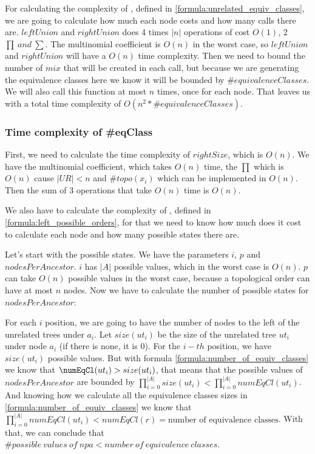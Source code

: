 For calculating the complexity of \unrEqCl, defined in \ref{formula:unrelated_equiv_classes}, we are going to calculate how much each node costs and how many calls there are. $leftUnion$ and $rightUnion$ does 4 times $|n|$ operations of cost $O(1)$, 2 $\prod \ and \ \sum$. The multinomial coefficient is $O(n)$ in the worst case, so $leftUnion$ and $rightUnion$ will have a $O(n)$ time complexity. Then we need to bound the number of $mix$ that will be created in each call, but because we are generating the equivalence classes here we know it will be bounded by $\#equivalenceClasses$. We will also call this function at most $n$ times, once for each node. That leaves us with a total time complexity of $O(n^2 * \#equivalenceClasses)$.

\subsubsection{Time complexity of \#eqClass}

First, we need to calculate the time complexity of $rightSize$, which is $O(n)$. We have the multinomial coefficient, which takes $O(n)$ time, the $\prod$ which is $O(n)$ cause $|UR|<n$ and $\#topo(x_i)$ which can be implemented in $O(n)$. Then the sum of 3 operations that take $O(n)$ time is $O(n)$. 


We also have to calculate the complexity of \leftPossibleOrders, defined in \ref{formula:left_possible_orders}, for that we need to know how much does it cost to calculate each node and how many possible states there are.

Let's start with the possible states. We have the parameters $i$, $p$ and $nodesPerAncestor$. $i$ has $|A|$ possible values, which in the worst case is $O(n)$. $p$ can take $O(n)$ possible values in the worst case, because a topological order can have at most $n$ nodes. Now we have to  calculate the number of possible states for $nodesPerAncestor$: 

For each $i$ position, we are going to have the number of nodes to the left of the unrelated trees under $a_i$. Let $size(ut_i)$ be the size of the unrelated tree $ut_i$ under node $a_i$ (if there is none, it is 0). For the $i-th$ position, we have $size(ut_i)$ possible values. But with formula \ref{formula:number_of_equiv_classes} we know that $\numEqCl(ut_i) > size(ut_i)$, that means that the possible values of $nodesPerAncestor$ are bounded by $\prod_{i=0}^{|A|} size(ut_i) < \prod_{i=0}^{|A|} numEqCl(ut_i)$. And knowing how we calculate all the equivalence classes sizes in \ref{formula:number_of_equiv_classes} we know that $\prod_{i=0}^{|A|} numEqCl(ut_i) < numEqCl(r) = \text{number of equivalence classes}$. With that, we can conclude that $\# possible \ values \ of \ npa < number \ of \ equivalence \ classes$. 

